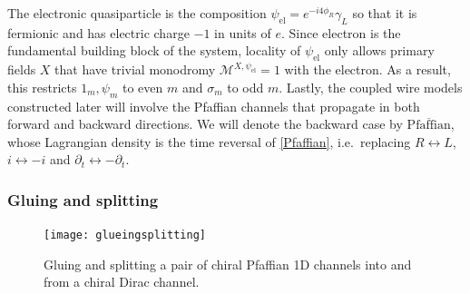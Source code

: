The electronic quasiparticle is the composition $\psi_{\mathrm{el}}=e^{-i4\phi_R}\gamma_L$ so that it is fermionic and has electric charge $-1$ in units of $e$. Since electron is the fundamental building block of the system, locality of $\psi_{\mathrm{el}}$ only allows primary fields $X$ that have trivial monodromy $\mathcal{M}^{X,\psi_{\mathrm{el}}}=1$ with the electron. As a result, this restricts $1_m,\psi_m$ to even $m$ and $\sigma_m$ to odd $m$. Lastly, the coupled wire models constructed later will involve the Pfaffian channels that propagate in both forward and backward directions. We will denote the backward case by $\overline{\mathrm{Pfaffian}}$, whose Lagrangian density is the time reversal of \eqref{Pfaffian}, i.e.~replacing $R\leftrightarrow L$, $i\leftrightarrow-i$ and $\partial_t\leftrightarrow-\partial_t$. 

\subsubsection{Gluing and splitting}\label{sec:gluing}

\begin{figure}[htbp]
	\centering\texttt{[image: glueingsplitting]}
	\caption{Gluing and splitting a pair of chiral Pfaffian 1D channels into and from a chiral Dirac channel.}\label{fig:glueingsplitting}
\end{figure}

